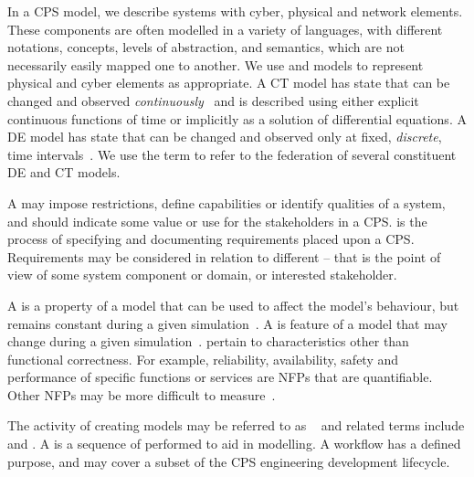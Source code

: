 
In a CPS model, we describe systems with cyber, physical and network elements. These components are often modelled in a variety of languages, with different notations, concepts, levels of abstraction, and semantics, which are not necessarily easily mapped one to another. We use  and  models to represent physical and cyber elements as appropriate. A CT model has state that can be changed and observed \emph{continuously}~\cite{Amerongen10} and is described using either explicit continuous functions of time or implicitly as a solution of differential equations. A DE model has state that can be changed and observed only at fixed, \emph{discrete}, time intervals~\cite{Amerongen10}.  We use the term  to refer to the federation of several constituent DE and CT models.

A  may impose restrictions, define capabilities or identify qualities of a system, and should indicate some value or use for the stakeholders in a CPS.  is the process of specifying and documenting requirements placed upon a CPS. Requirements may be considered in relation to different  -- that is the point of view of some system component or domain, or interested stakeholder.

A  is a property of a model that can be used to affect the model's behaviour, but remains constant during a given simulation~\cite{Broenink&12b}. A  is feature of a model that may change during a given simulation~\cite{Broenink&12b}.  pertain to characteristics other than functional correctness. For example, reliability, availability, safety and performance of specific functions or services are NFPs that are quantifiable. Other NFPs may be more difficult to measure~\cite{Payne&10}.

The activity of creating models may be referred to as  ~\cite{Fitzgerald&14c} and related terms include  and . A  is a sequence of  performed to aid in modelling. A workflow has a defined purpose, and may cover a subset of the CPS engineering development lifecycle.

